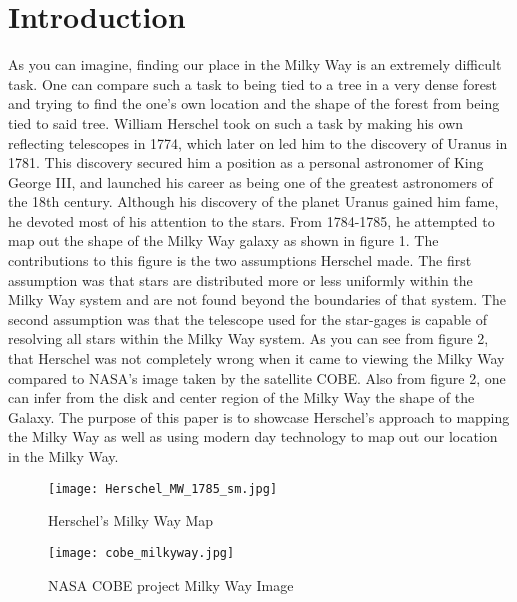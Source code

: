 \documentclass[%
 reprint,
 amsmath,amssymb,
 aps,
]{revtex4-1}
\begin{document}
\section{\label{sec:level1}Introduction}
As you can imagine, finding our place in the Milky Way is an extremely difficult task. One can compare such a task to being tied to a tree in a very dense forest and trying to find the one's own location and the shape of the forest from being tied to said tree. William Herschel took on such a task by making his own reflecting telescopes in 1774, which later on led him to the discovery of Uranus in 1781. 
This discovery secured him a position as a personal astronomer of King George III, and launched his career as being one of the 
greatest astronomers of the 18th century. Although his discovery of the planet Uranus gained him fame, he devoted most of his 
attention to the stars. From 1784-1785, he attempted to map out the shape of the Milky Way galaxy as shown in figure 1. The contributions 
to this figure is the two assumptions Herschel made. The first assumption was that stars are distributed more or less uniformly within the Milky Way system and are not found beyond the boundaries of that system. The second assumption was that the telescope used for the star-gages is capable of resolving all stars within the Milky Way system. As you can see from figure 2, that Herschel was not completely wrong when it came to viewing the Milky Way compared to NASA's image taken by the satellite COBE. Also from figure 2, one can infer from the disk and center region of the Milky Way the shape of the Galaxy.  The purpose of this paper is to showcase Herschel's approach to mapping the Milky Way as well as using modern day technology to map out our location in the Milky Way. 

\begin{figure}[htbp] %
   \centering
   \texttt{[image: Herschel\_MW\_1785\_sm.jpg]} 
   \caption{Herschel's Milky Way Map}
   \label{fig 1}
\end{figure}

\begin{figure}[htbp] %
   \centering
   \texttt{[image: cobe\_milkyway.jpg]} 
   \caption{NASA COBE project Milky Way Image}
   \label{fig 2}
\end{figure}
\end{document}
